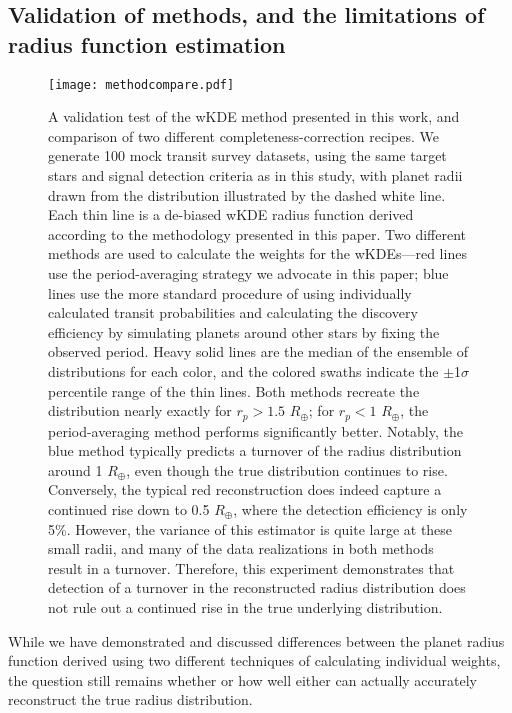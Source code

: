 \documentclass[iop]{emulateapj}
\def\Rearth{R_\oplus}
\begin{document}
\subsection{Validation of methods, and the limitations of radius function estimation}
\label{sec:validation}

\begin{figure}[t!]
   \centering
   \texttt{[image: methodcompare.pdf]} %
   \caption{A validation test of the wKDE method presented in this work, and comparison of two different completeness-correction recipes.  We generate 100 mock transit survey datasets, using the same target stars and signal detection criteria as in this study, with planet radii drawn from the distribution illustrated by the dashed white line.  Each thin line is a de-biased wKDE radius function derived according to the methodology presented in this paper.  Two different methods are used to calculate the weights for the wKDEs---red lines use the period-averaging strategy we advocate in this paper; blue lines use the more standard procedure of using individually calculated transit probabilities and calculating the discovery efficiency by simulating planets around other stars by fixing the observed period.  Heavy solid lines are the median of the ensemble of distributions for each color, and the colored swaths indicate the $\pm$1$\sigma$ percentile range of the thin lines.  Both methods recreate the distribution nearly exactly for $r_p > 1.5$ $\Rearth$; for $r_p < 1$ $\Rearth$, the period-averaging method performs significantly better.  Notably, the blue method typically predicts a turnover of the radius distribution around 1 $\Rearth$, even though the true distribution continues to rise.  Conversely, the typical red reconstruction does indeed capture a continued rise down to 0.5 $\Rearth$, where the detection efficiency is only 5\%.  However, the variance of this estimator is quite large at these small radii, and many of the data realizations in both methods result in a turnover.  Therefore, this experiment demonstrates that detection of a turnover in the reconstructed radius distribution does not rule out a continued rise in the true underlying distribution.}
   \label{fig:methodcompare}
\end{figure}


While we have demonstrated and discussed differences between the planet radius function derived using two different techniques of calculating individual weights, the question still remains whether or how well either can actually accurately reconstruct the true radius distribution.  
\end{document}
